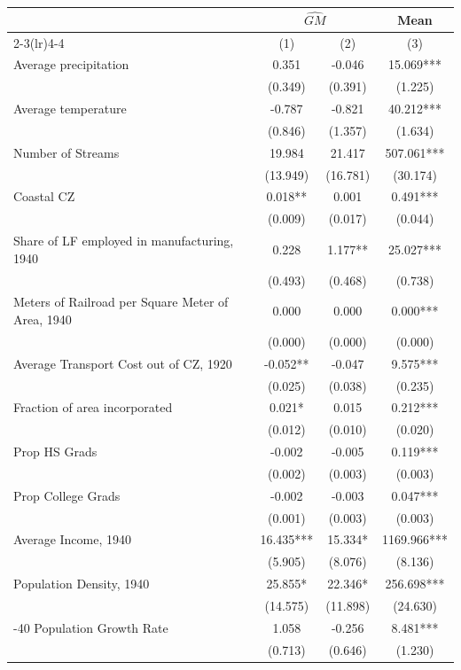 \begin{tabular}{l*{3}{c}} \toprule
&\multicolumn{2}{c}{$\widehat{GM}$}&\multicolumn{1}{c}{Mean}\\\cmidrule(lr){2-3}\cmidrule(lr){4-4}
&\multicolumn{1}{c}{(1)}&\multicolumn{1}{c}{(2)}&\multicolumn{1}{c}{(3)}\\
\midrule
Average precipitation&    0.351   &   -0.046   &   15.069***\\
                &  (0.349)   &  (0.391)   &  (1.225)   \\
\addlinespace
Average temperature&   -0.787   &   -0.821   &   40.212***\\
                &  (0.846)   &  (1.357)   &  (1.634)   \\
\addlinespace
Number of Streams&   19.984   &   21.417   &  507.061***\\
                & (13.949)   & (16.781)   & (30.174)   \\
\addlinespace
Coastal CZ      &    0.018** &    0.001   &    0.491***\\
                &  (0.009)   &  (0.017)   &  (0.044)   \\
\addlinespace
Share of LF employed in manufacturing, 1940&    0.228   &    1.177** &   25.027***\\
                &  (0.493)   &  (0.468)   &  (0.738)   \\
\addlinespace
Meters of Railroad per Square Meter of Area, 1940&    0.000   &    0.000   &    0.000***\\
                &  (0.000)   &  (0.000)   &  (0.000)   \\
\addlinespace
Average Transport Cost out of CZ, 1920&   -0.052** &   -0.047   &    9.575***\\
                &  (0.025)   &  (0.038)   &  (0.235)   \\
\addlinespace
Fraction of area incorporated&    0.021*  &    0.015   &    0.212***\\
                &  (0.012)   &  (0.010)   &  (0.020)   \\
\addlinespace
Prop HS Grads   &   -0.002   &   -0.005   &    0.119***\\
                &  (0.002)   &  (0.003)   &  (0.003)   \\
\addlinespace
Prop College Grads&   -0.002   &   -0.003   &    0.047***\\
                &  (0.001)   &  (0.003)   &  (0.003)   \\
\addlinespace
Average Income, 1940&   16.435***&   15.334*  & 1169.966***\\
                &  (5.905)   &  (8.076)   &  (8.136)   \\
\addlinespace
Population Density, 1940&   25.855*  &   22.346*  &  256.698***\\
                & (14.575)   & (11.898)   & (24.630)   \\
\addlinespace
1930-40 Population Growth Rate&    1.058   &   -0.256   &    8.481***\\
                &  (0.713)   &  (0.646)   &  (1.230)   \\
       \bottomrule \end{tabular}
